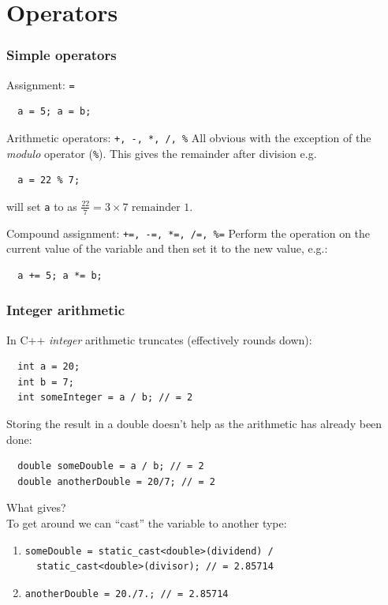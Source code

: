 \documentclass{beamer}
\begin{document}
\section{Operators}

\begin{frame}[fragile]
 \frametitle{Simple operators}
 \begin{block}{Assignment: \texttt{=}}
    \begin{lstlisting}
  a = 5; a = b;
   \end{lstlisting}
  \end{block}
  \pause
  \begin{block}{Arithmetic operators: \texttt{+, -, *, /, \%}}
   All obvious with the exception of the \textit{modulo} operator (\texttt{\%}).  This gives the remainder after division e.g.
  \begin{lstlisting}
  a = 22 % 7;
  \end{lstlisting}
  will set \texttt{a} to  as $\frac{22}{7} = 3 \times 7 \text{ remainder } 1$.
 \end{block}
 \pause
 \begin{block}{Compound assignment: \texttt{+=, -=, *=, /=, \%=}}
  Perform the operation on the current value of the variable and then set it to the new value, e.g.:
  \begin{lstlisting}
  a += 5; a *= b;
  \end{lstlisting}
 \end{block} %
\end{frame}


\begin{frame}[fragile]
  \frametitle{Integer arithmetic}
  
  \begin{warnblocke}
  	In C++ \emph{integer} arithmetic truncates (effectively rounds down):
  	\begin{lstlisting}
  int a = 20;
  int b = 7;
  int someInteger = a / b; // = 2
  	\end{lstlisting}
  	Storing the result in a double doesn't help as the arithmetic has already been done:
  	\begin{lstlisting}
  double someDouble = a / b; // = 2
  double anotherDouble = 20/7; // = 2
  	\end{lstlisting}
  \end{warnblocke}
  	What gives?\\
  	\pause{}  To get around we can ``cast'' the variable to another type:
  	\begin{enumerate}
  	  \item{
  	  	\begin{lstlisting}
someDouble = static_cast<double>(dividend) /
  static_cast<double>(divisor); // = 2.85714
  	  	\end{lstlisting}}
  	  \item{
  	  	\begin{lstlisting}
anotherDouble = 20./7.; // = 2.85714
  	  	\end{lstlisting}}
  	  
  	\end{enumerate}

\end{frame}
\end{document}
